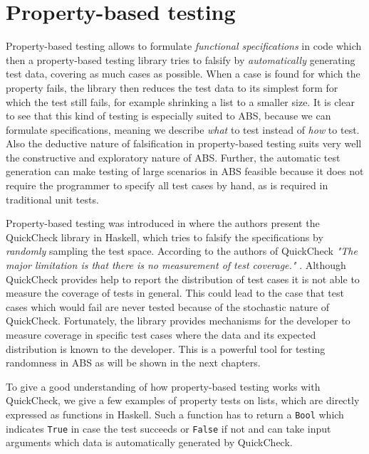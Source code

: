 \section{Property-based testing}
\label{sec:proptesting}
Property-based testing allows to formulate \textit{functional specifications} in code which then a property-based testing library tries to falsify by \textit{automatically} generating test data, covering as much cases as possible. When a case is found for which the property fails, the library then reduces the test data to its simplest form for which the test still fails, for example shrinking a list to a smaller size. It is clear to see that this kind of testing is especially suited to ABS, because we can formulate specifications, meaning we describe \textit{what} to test instead of \textit{how} to test. Also the deductive nature of falsification in property-based testing suits very well the constructive and exploratory nature of ABS. Further, the automatic test generation can make testing of large scenarios in ABS feasible because it does not require the programmer to specify all test cases by hand, as is required in traditional unit tests.

Property-based testing was introduced in \cite{claessen_quickcheck_2000,claessen_testing_2002} where the authors present the QuickCheck library in Haskell, which tries to falsify the specifications by \textit{randomly} sampling the test space. According to the authors of QuickCheck \textit{"The major limitation is that there is no measurement of test coverage."} \cite{claessen_quickcheck_2000}. Although QuickCheck provides help to report the distribution of test cases it is not able to measure the coverage of tests in general. This could lead to the case that test cases which would fail are never tested because of the stochastic nature of QuickCheck. Fortunately, the library provides mechanisms for the developer to measure coverage in specific test cases where the data and its expected distribution is known to the developer. This is a powerful tool for testing randomness in ABS as will be shown in the next chapters.

\medskip

To give a good understanding of how property-based testing works with \\ QuickCheck, we give a few examples of property tests on lists, which are directly expressed as functions in Haskell. Such a function has to return a \texttt{Bool} which indicates \texttt{True} in case the test succeeds or \texttt{False} if not and can take input arguments which data is automatically generated by QuickCheck.

